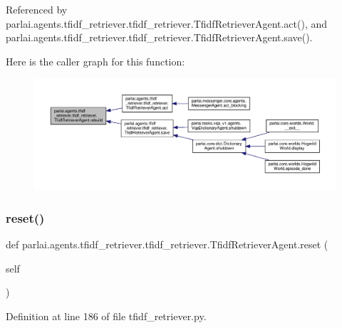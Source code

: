 Referenced by parlai.\+agents.\+tfidf\+\_\+retriever.\+tfidf\+\_\+retriever.\+Tfidf\+Retriever\+Agent.\+act(), and parlai.\+agents.\+tfidf\+\_\+retriever.\+tfidf\+\_\+retriever.\+Tfidf\+Retriever\+Agent.\+save().

Here is the caller graph for this function\+:
\nopagebreak
\begin{figure}[H]
\begin{center}
\leavevmode
\includegraphics[width=350pt]{classparlai_1_1agents_1_1tfidf__retriever_1_1tfidf__retriever_1_1TfidfRetrieverAgent_a434a29fe242e98aef091ec1e277d420f_icgraph}
\end{center}
\end{figure}
\mbox{\label{classparlai_1_1agents_1_1tfidf__retriever_1_1tfidf__retriever_1_1TfidfRetrieverAgent_a4d9e8962cb44451758ea13b09b8dbd86}} 
\subsubsection{\texorpdfstring{reset()}{reset()}}
{\footnotesize\ttfamily def parlai.\+agents.\+tfidf\+\_\+retriever.\+tfidf\+\_\+retriever.\+Tfidf\+Retriever\+Agent.\+reset (\begin{DoxyParamCaption}\item[{}]{self }\end{DoxyParamCaption})}



Definition at line 186 of file tfidf\+\_\+retriever.\+py.



